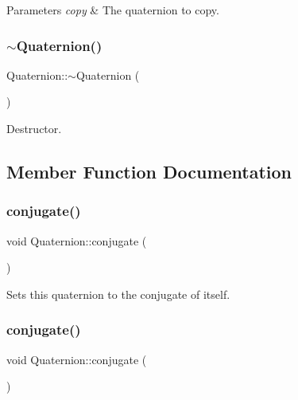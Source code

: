 \begin{DoxyParams}{Parameters}
{\em copy} & The quaternion to copy. \\
\hline
\end{DoxyParams}
\mbox{\label{classQuaternion_a5f834c2ca469cd71edc8a23fdc3f56e8}} 
\subsubsection{\texorpdfstring{$\sim$\+Quaternion()}{~Quaternion()}\hspace{0.1cm}{\footnotesize\ttfamily [2/2]}}
{\footnotesize\ttfamily Quaternion\+::$\sim$\+Quaternion (\begin{DoxyParamCaption}{ }\end{DoxyParamCaption})}

Destructor. 

\subsection{Member Function Documentation}
\mbox{\label{classQuaternion_ae387bec8f394bdc58a5ac1480f11140f}} 
\subsubsection{\texorpdfstring{conjugate()}{conjugate()}\hspace{0.1cm}{\footnotesize\ttfamily [1/2]}}
{\footnotesize\ttfamily void Quaternion\+::conjugate (\begin{DoxyParamCaption}{ }\end{DoxyParamCaption})}

Sets this quaternion to the conjugate of itself. \mbox{\label{classQuaternion_ae387bec8f394bdc58a5ac1480f11140f}} 
\subsubsection{\texorpdfstring{conjugate()}{conjugate()}\hspace{0.1cm}{\footnotesize\ttfamily [2/2]}}
{\footnotesize\ttfamily void Quaternion\+::conjugate (\begin{DoxyParamCaption}{ }\end{DoxyParamCaption})}

